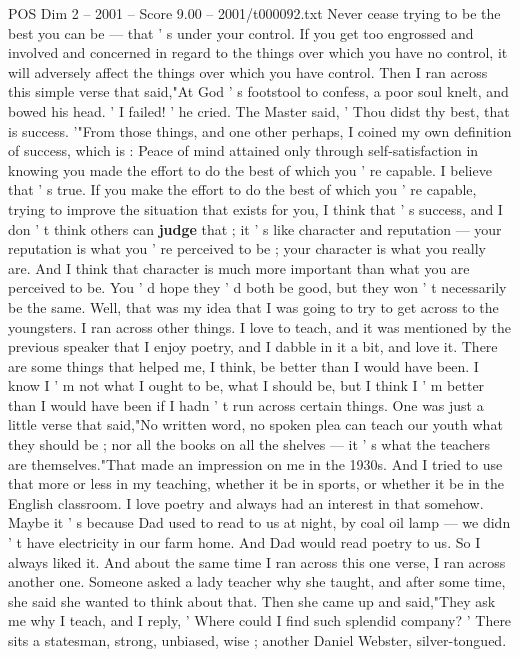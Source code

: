 \begin{textsample}{POS Dim 2 – 2001 – Score 9.00 – 2001/t000092.txt}
Never cease trying to be the best you can be — that ' s under your control.
If you get too engrossed and involved and concerned in regard to the things over which you have no control, it will adversely affect the things over which you have control.
Then I ran across this simple verse that said,"At God ' s footstool to confess, a poor soul knelt, and bowed his head. ' I failed! ' he cried.
The Master said, ' Thou didst thy best, that is success. '"From those things, and one other perhaps, I coined my own definition of success, which is : Peace of mind attained only through self-satisfaction in knowing you made the effort to do the best of which you ' re capable.
I believe that ' s true.
If you make the effort to do the best of which you ' re capable, trying to improve the situation that exists for you, I think that ' s success, and I don ' t think others can \textbf{judge} that ; it ' s like character and reputation — your reputation is what you ' re perceived to be ; your character is what you really are.
And I think that character is much more important than what you are perceived to be.
You ' d hope they ' d both be good, but they won ' t necessarily be the same.
Well, that was my idea that I was going to try to get across to the youngsters.
I ran across other things.
I love to teach, and it was mentioned by the previous speaker that I enjoy poetry, and I dabble in it a bit, and love it.
There are some things that helped me, I think, be better than I would have been.
I know I ' m not what I ought to be, what I should be, but I think I ' m better than I would have been if I hadn ' t run across certain things.
One was just a little verse that said,"No written word, no spoken plea can teach our youth what they should be ; nor all the books on all the shelves — it ' s what the teachers are themselves."That made an impression on me in the 1930s.
And I tried to use that more or less in my teaching, whether it be in sports, or whether it be in the English classroom.
I love poetry and always had an interest in that somehow.
Maybe it ' s because Dad used to read to us at night, by coal oil lamp — we didn ' t have electricity in our farm home.
And Dad would read poetry to us.
So I always liked it.
And about the same time I ran across this one verse, I ran across another one.
Someone asked a lady teacher why she taught, and after some time, she said she wanted to think about that.
Then she came up and said,"They ask me why I teach, and I reply, ' Where could I find such splendid company? ' There sits a statesman, strong, unbiased, wise ; another Daniel Webster, silver-tongued.

\end{textsample}
